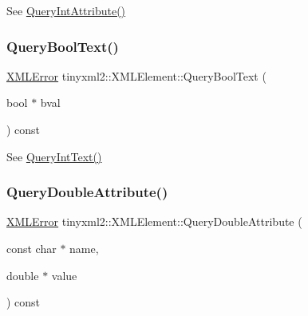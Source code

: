 See \hyperlink{classtinyxml2_1_1_x_m_l_element_a8a78bc1187c1c45ad89f2690eab567b1}{Query\+Int\+Attribute()} 

\mbox{\label{classtinyxml2_1_1_x_m_l_element_a3fe5417d59eb8f5c4afe924b7d332736}} 
\subsubsection{\texorpdfstring{Query\+Bool\+Text()}{QueryBoolText()}}
{\footnotesize\ttfamily \hyperlink{namespacetinyxml2_a1fbf88509c3ac88c09117b1947414e08}{X\+M\+L\+Error} tinyxml2\+::\+X\+M\+L\+Element\+::\+Query\+Bool\+Text (\begin{DoxyParamCaption}\item[{bool $\ast$}]{bval }\end{DoxyParamCaption}) const}



See \hyperlink{classtinyxml2_1_1_x_m_l_element_a926357996bef633cb736e1a558419632}{Query\+Int\+Text()} 

\mbox{\label{classtinyxml2_1_1_x_m_l_element_a5f0964e2dbd8e2ee7fce9beab689443c}} 
\subsubsection{\texorpdfstring{Query\+Double\+Attribute()}{QueryDoubleAttribute()}}
{\footnotesize\ttfamily \hyperlink{namespacetinyxml2_a1fbf88509c3ac88c09117b1947414e08}{X\+M\+L\+Error} tinyxml2\+::\+X\+M\+L\+Element\+::\+Query\+Double\+Attribute (\begin{DoxyParamCaption}\item[{const char $\ast$}]{name,  }\item[{double $\ast$}]{value }\end{DoxyParamCaption}) const\hspace{0.3cm}{\ttfamily [inline]}}




